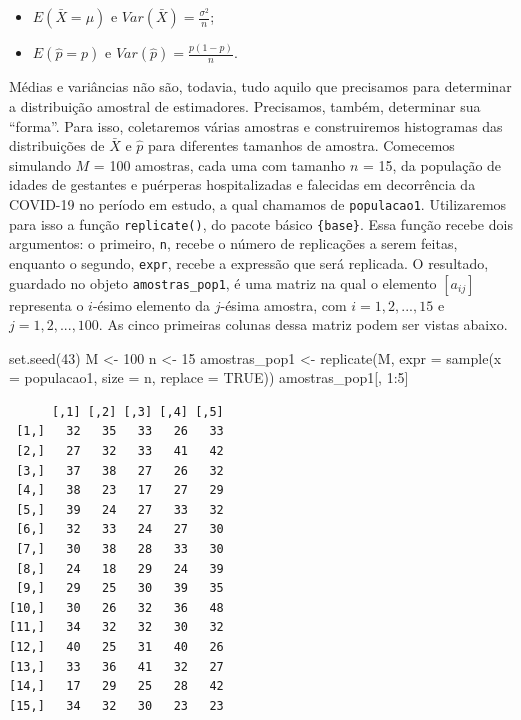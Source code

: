 \documentclass[
  letterpaper,
  DIV=11,
  numbers=noendperiod]{scrreprt}
\newenvironment{Shaded}{\begin{snugshade}}{\end{snugshade}}
\newcommand{\AttributeTok}[1]{\textcolor[rgb]{0.40,0.45,0.13}{#1}}
\newcommand{\ConstantTok}[1]{\textcolor[rgb]{0.56,0.35,0.01}{#1}}
\newcommand{\DecValTok}[1]{\textcolor[rgb]{0.68,0.00,0.00}{#1}}
\newcommand{\FunctionTok}[1]{\textcolor[rgb]{0.28,0.35,0.67}{#1}}
\newcommand{\NormalTok}[1]{\textcolor[rgb]{0.00,0.23,0.31}{#1}}
\newcommand{\OtherTok}[1]{\textcolor[rgb]{0.00,0.23,0.31}{#1}}
\newcommand{\SpecialCharTok}[1]{\textcolor[rgb]{0.37,0.37,0.37}{#1}}
\providecommand{\tightlist}{%
  \setlength{\itemsep}{0pt}\setlength{\parskip}{0pt}}\usepackage{longtable,booktabs,array}
\begin{document}
\begin{itemize}
\tightlist
\item
  \(E(\bar{X} = \mu)\) e
  \(Var(\bar{X}) = \displaystyle \frac{\sigma^2}{n}\);
\item
  \(E(\hat{p} = p)\) e
  \(Var(\hat{p}) = \displaystyle \frac{p(1 - p)}{n}\).
\end{itemize}

Médias e variâncias não são, todavia, tudo aquilo que precisamos para
determinar a distribuição amostral de estimadores. Precisamos, também,
determinar sua ``forma''. Para isso, coletaremos várias amostras e
construiremos histogramas das distribuições de \(\bar{X}\) e \(\hat{p}\)
para diferentes tamanhos de amostra. Comecemos simulando \(M\) = 100
amostras, cada uma com tamanho \(n\) = 15, da população de idades de
gestantes e puérperas hospitalizadas e falecidas em decorrência da
COVID-19 no período em estudo, a qual chamamos de \texttt{populacao1}.
Utilizaremos para isso a função \texttt{replicate()}, do pacote básico
\texttt{\{base\}}. Essa função recebe dois argumentos: o primeiro,
\texttt{n}, recebe o número de replicações a serem feitas, enquanto o
segundo, \texttt{expr}, recebe a expressão que será replicada. O
resultado, guardado no objeto \texttt{amostras\_pop1}, é uma matriz na
qual o elemento \([a_{ij}]\) representa o \(i\)-ésimo elemento da
\(j\)-ésima amostra, com \(i = 1, 2, ..., 15\) e \(j = 1, 2, ..., 100\).
As cinco primeiras colunas dessa matriz podem ser vistas abaixo.

\begin{Shaded}
\begin{Highlighting}[]
\FunctionTok{set.seed}\NormalTok{(}\DecValTok{43}\NormalTok{)}
\NormalTok{M }\OtherTok{\textless{}{-}} \DecValTok{100}
\NormalTok{n }\OtherTok{\textless{}{-}} \DecValTok{15}
\NormalTok{amostras\_pop1 }\OtherTok{\textless{}{-}} \FunctionTok{replicate}\NormalTok{(M, }\AttributeTok{expr =} \FunctionTok{sample}\NormalTok{(}\AttributeTok{x =}\NormalTok{ populacao1, }\AttributeTok{size =}\NormalTok{ n, }\AttributeTok{replace =} \ConstantTok{TRUE}\NormalTok{))}
\NormalTok{amostras\_pop1[, }\DecValTok{1}\SpecialCharTok{:}\DecValTok{5}\NormalTok{]}
\end{Highlighting}
\end{Shaded}

\begin{verbatim}
      [,1] [,2] [,3] [,4] [,5]
 [1,]   32   35   33   26   33
 [2,]   27   32   33   41   42
 [3,]   37   38   27   26   32
 [4,]   38   23   17   27   29
 [5,]   39   24   27   33   32
 [6,]   32   33   24   27   30
 [7,]   30   38   28   33   30
 [8,]   24   18   29   24   39
 [9,]   29   25   30   39   35
[10,]   30   26   32   36   48
[11,]   34   32   32   30   32
[12,]   40   25   31   40   26
[13,]   33   36   41   32   27
[14,]   17   29   25   28   42
[15,]   34   32   30   23   23
\end{verbatim}
\end{document}
